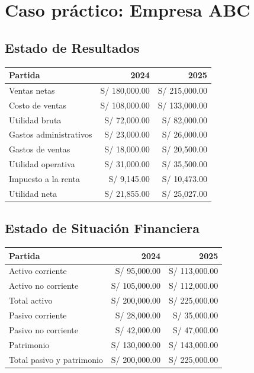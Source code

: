 \section{Caso práctico: Empresa ABC}

\subsection{Estado de Resultados}

\begin{center}
\begin{tabular}{lrr}
\toprule
Partida & 2024 & 2025 \\
\midrule
Ventas netas & S/ 180,000.00 & S/ 215,000.00 \\
Costo de ventas & S/ 108,000.00 & S/ 133,000.00 \\
Utilidad bruta & S/ 72,000.00 & S/ 82,000.00 \\
Gastos administrativos & S/ 23,000.00 & S/ 26,000.00 \\
Gastos de ventas & S/ 18,000.00 & S/ 20,500.00 \\
Utilidad operativa & S/ 31,000.00 & S/ 35,500.00 \\
Impuesto a la renta & S/ 9,145.00 & S/ 10,473.00 \\
Utilidad neta & S/ 21,855.00 & S/ 25,027.00 \\
\bottomrule
\end{tabular}
\end{center}

\subsection{Estado de Situación Financiera}

\begin{center}
\begin{tabular}{lrr}
\toprule
Partida & 2024 & 2025 \\
\midrule
Activo corriente & S/ 95,000.00 & S/ 113,000.00 \\
Activo no corriente & S/ 105,000.00 & S/ 112,000.00 \\
Total activo & S/ 200,000.00 & S/ 225,000.00 \\
Pasivo corriente & S/ 28,000.00 & S/ 35,000.00 \\
Pasivo no corriente & S/ 42,000.00 & S/ 47,000.00 \\
Patrimonio & S/ 130,000.00 & S/ 143,000.00 \\
Total pasivo y patrimonio & S/ 200,000.00 & S/ 225,000.00 \\
\bottomrule
\end{tabular}
\end{center}
